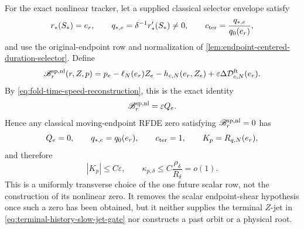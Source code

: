 \begin{proposition}
For the exact nonlinear tracker, let a supplied classical selector envelope
satisfy
\begin{equation}
 r_*(S_*)=e_r,\qquad
 q_{*,e}=\delta^{-1}r_*'(S_*)\ne0,\qquad
 c_{\rm ter}=\frac{q_{*,e}}{q_0(e_r)},                      \label{eq:speed-aligned-selector-normalization}
\end{equation}
and use the original-endpoint row and normalization of
\cref{lem:endpoint-centered-duration-selector}.  Define
\begin{equation}
 \mathscr B_{r}^{\rm sp,nl}(r,Z,p)
 =p_e-\ell_N(e_r)Z_e-h_{c,N}(e_r,Z_e)
       +\varepsilon\Delta\mathcal D_{c,N}^{\rm ft}(e_r).
                                                        \label{eq:speed-aligned-nonlinear-row}
\end{equation}
By \cref{eq:fold-time-speed-reconstruction}, this is the exact identity
\begin{equation}
 \mathscr B_r^{\rm sp,nl}=\varepsilon Q_e.       \label{eq:speed-aligned-nonlinear-speed}
\end{equation}
Hence any classical moving-endpoint RFDE zero satisfying
\(\mathscr B_r^{\rm sp,nl}=0\) has
\begin{equation}
 Q_e=0,
 \qquad q_{*,e}=q_0(e_r),
 \qquad c_{\rm ter}=1,
 \qquad K_p=R_{q,N}(e_r),                        \label{eq:speed-aligned-endpoint-consequences}
\end{equation}
and therefore
\begin{equation}
 |K_p|\le C\varepsilon,
 \qquad
 \kappa_{p,\delta}\le C\frac{\rho_\delta}{R_\delta}=o(1).
                                                        \label{eq:speed-aligned-endpoint-shear}
\end{equation}
This is a uniformly transverse choice of the one future scalar row, not the
construction of its nonlinear zero.  It removes the scalar endpoint-shear
hypothesis once such a zero has been obtained, but it neither supplies the
terminal \(Z\)-jet in
\cref{eq:terminal-history-slow-jet-gate} nor constructs a past orbit or a
physical root.
\end{proposition}


